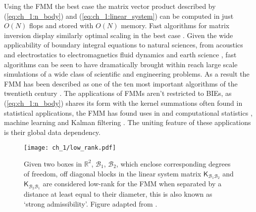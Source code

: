 Using the FMM the best case the matrix vector product described by (\ref{eq:ch_1:n_body}) and (\ref{eq:ch_1:linear_system}) can be computed in just $O(N)$ flops and stored with $O(N)$ memory. Fast algorithms for matrix inversion display similarly optimal scaling in the best case \cite{minden2017recursive}. Given the wide applicability of boundary integral equations to natural sciences, from acoustics \cite{wolf2011aeroacoustic,hao2015efficient} and electrostatics \cite{wang2021high} to electromagnetics \cite{darve2004fast} fluid dynamics \cite{rahimian2010petascale} and earth science \cite{chaillat2008multi}, fast algorithms can be seen to have dramatically brought within reach large scale simulations of a wide class of scientific and engineering problems. As a result the FMM has been described as one of the ten most important algorithms of the twentieth century \cite{cipra2000best}. The applications of FMMs aren't restricted to BIEs, as (\ref{eq:ch_1:n_body}) shares its form with the kernel summations often found in statistical applications, the FMM has found uses in and computational statistics \cite{ambikasaran2013large}, machine learning \cite{lee2012distributed} and Kalman filtering \cite{li2014kalman}. The uniting feature of these applications is their global data dependency. 

\begin{figure}
    \centering
    \texttt{[image: ch\_1/low\_rank.pdf]}
    \caption{Given two boxes in $\mathbb{R}^2$, $\mathcal{B}_1$, $\mathcal{B}_2$, which enclose corresponding degrees of freedom, off diagonal blocks in the linear system matrix $\mathsf{K}_{\mathcal{B}_1\mathcal{B}_2}$ and $\mathsf{K}_{\mathcal{B}_2\mathcal{B}_1}$ are considered low-rank for the FMM when separated by a distance at least equal to their diameter, this is also known as `strong admissibility'. Figure adapted from \cite{minden2017recursive}.}
    \label{fig:ch_1:low_rank}
\end{figure}

